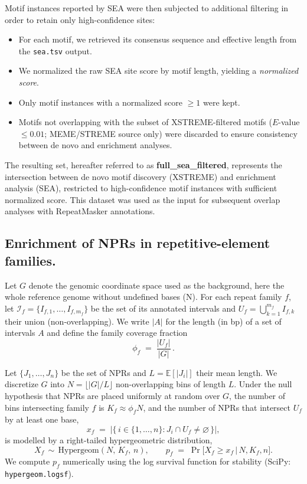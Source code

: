 \documentclass[11pt]{book}
\begin{document}
Motif instances reported by SEA were then subjected to additional filtering in order to retain 
only high-confidence sites:  

\begin{itemize}
    \item For each motif, we retrieved its consensus sequence and effective length 
    from the \texttt{sea.tsv} output.  
    \item We normalized the raw SEA site score by motif length, yielding a 
    \textit{normalized score}.  
    \item Only motif instances with a normalized score $\geq 1$ were kept.  
    \item Motifs not overlapping with the subset of XSTREME-filtered motifs 
    ($E$-value $\leq 0.01$; MEME/STREME source only) were discarded to ensure 
    consistency between de novo and enrichment analyses.  
\end{itemize}

The resulting set, hereafter referred to as \textbf{full\_sea\_filtered}, represents the 
intersection between de novo motif discovery (XSTREME) and enrichment analysis (SEA), 
restricted to high-confidence motif instances with sufficient normalized score. This dataset 
was used as the input for subsequent overlap analyses with RepeatMasker annotations.

\subsection{Enrichment of NPRs in repetitive-element families.}
Let $G$ denote the genomic coordinate space used as the background, here the whole reference genome without undefined bases (N). 
For each repeat family $f$, let $\mathcal{I}_f=\{I_{f,1},\dots,I_{f,m_f}\}$ be the set of its annotated intervals and $U_f=\bigcup_{k=1}^{m_f} I_{f,k}$ their union (non-overlapping). 
We write $|A|$ for the length (in bp) of a set of intervals $A$ and define the family coverage fraction
\[
\phi_f \;=\; \frac{|U_f|}{|G|}\, .
\]

Let $\{J_1,\dots,J_n\}$ be the set of NPRs and $L=\mathbb{E}[|J_i|]$ their mean length. 
We discretize $G$ into $N=\big\lfloor |G|/L \big\rfloor$ non-overlapping bins of length $L$. 
Under the null hypothesis that NPRs are placed uniformly at random over $G$, the number of bins intersecting family $f$ is $K_f \approx \phi_f N$, and the number of NPRs that intersect $U_f$ by at least one base,
\[
x_f \;=\; \big|\{\,i\in\{1,\dots,n\}: J_i \cap U_f \neq \varnothing \,\}\big| ,
\]
is modelled by a right-tailed hypergeometric distribution,
\[
X_f \,\sim\, \mathrm{Hypergeom}(N,\, K_f,\, n), 
\qquad 
p_f \;=\; \Pr\!\big[X_f \ge x_f \,\big|\, N,K_f,n\big] .
\]
We compute $p_f$ numerically using the log survival function for stability (SciPy: \texttt{hypergeom.logsf}).\\
\end{document}
